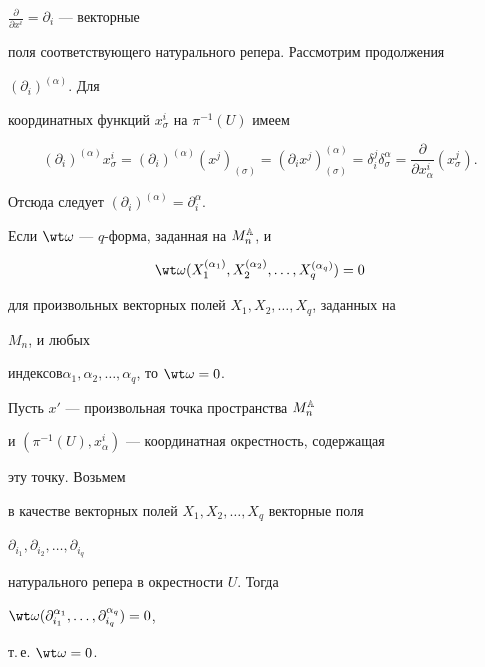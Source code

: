 $\frac{\partial}{\partial x^i}=\partial_i$ --- векторные 


поля соответствующего натурального репера. Рассмотрим продолжения 


$(\partial_i)^{(\alpha)}$. Для 


координатных функций $x^i_\sigma$ на $\pi^{-1}(U)$ имеем 


$$ 


(\partial_i)^{(\alpha)}x^i_\sigma=(\partial_i)^{(\alpha)} 


(x^j)_{(\sigma)}=(\partial_i x^j)^{(\alpha)}_{(\sigma)}= 


\delta^j_i\delta^\alpha_\sigma= 


\frac{\partial}{\partial x^i_\alpha}(x^j_\sigma). 


$$ 


Отсюда следует $(\partial_i)^{(\alpha)}=\partial^\alpha_i$. 


 


\begin{props} Если $\wt\omega$ --- $q$-форма, заданная на $M^{\Bbb A}_n$, и 


$$ 


\wt\omega(X^{(\alpha_1)}_1,X^{(\alpha_2)}_2,\dotsc, 


X^{(\alpha_q)}_q)=0 


$$ 


для произвольных векторных полей $X_1,X_2,\dotsc,X_q$, заданных на 


$M_n$, и любых


индексов\linebreak $\alpha_1,\alpha_2,\dotsc,\alpha_q$, то $\wt\omega=0$. 


\end{props} 


 


\begin{pf} Пусть $x'$ --- произвольная точка пространства $M^{\Bbb A}_n$ 


и $(\pi^{-1}(U),x^i_\alpha)$ --- координатная окрестность, содержащая 


эту точку. Возьмем 


в качестве векторных полей $X_1,X_2,\dotsc,X_q$ векторные поля 


$\partial_{i_1},\partial_{i_2},\dotsc,\partial_{i_q}$ 


натурального репера в окрестности $U$. Тогда 


$\wt\omega(\partial^{\alpha_1}_{i_1},\dotsc, 


\partial^{\alpha_q}_{i_q})=0$, 


т.\,е. $\wt\omega=0$. 


\end{pf} 


